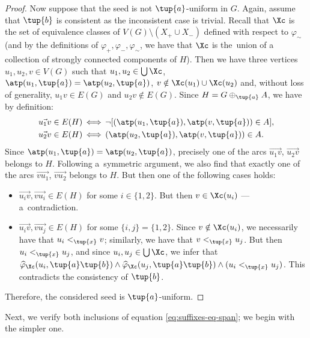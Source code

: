 \begin{proof}
    Now suppose that the seed is not $\tup{a}$-uniform in $G$.
    Again, assume that $\tup{b}$ is consistent as the inconsistent case is trivial.
    Recall that $\Xc$ is the set of equivalence classes of $V(G) \setminus (X_+ \cup X_-)$ defined with respect to $\varphi_\sim$ (and by the definitions of $\varphi_+, \varphi_-, \varphi_\sim$, we have that $\Xc$ is the~union of a collection of strongly connected components of $H$).
    Then we have three vertices $u_1, u_2, v \in V(G)$ such that $u_1, u_2 \in \bigcup \Xc$, $\atp(u_1, \tup{a}) = \atp(u_2, \tup{a})$, $v \notin \Xc(u_1) \cup \Xc(u_2)$ and, without loss of generality, $u_1v \in E(G)$ and $u_2v \notin E(G)$.
    Since $H = G \oplus_{\tup{a}} A$, we have by definition:
    \begin{align*}
        \vec{u_1v} \in E(H) \,&\Longleftrightarrow\, \neg [ (\atp(u_1, \tup{a}), \atp(v, \tup{a})) \in A ], \\
        \vec{u_2v} \in E(H) \,&\Longleftrightarrow\, (\atp(u_2, \tup{a}), \atp(v, \tup{a})) \in A.
    \end{align*}
    Since $\atp(u_1, \tup{a}) = \atp(u_2, \tup{a})$, precisely one of the arcs $\vec{u_1v}$, $\vec{u_2v}$ belongs to $H$.
    Following a~symmetric argument, we also find that exactly one of the arcs $\vec{vu_1}$, $\vec{vu_2}$ belongs to $H$.
    But then one of the following cases holds:
    \begin{itemize}[nosep]
        \item $\vec{u_iv}, \vec{vu_i} \in E(H)$ for some $i \in \{1,2\}$.
        But then $v \in \Xc(u_i)$ --- a~contradiction.
        \item $\vec{u_iv}, \vec{vu_j} \in E(H)$ for some $\{i, j\} = \{1, 2\}$.
        Since $v \notin \Xc(u_i)$, we necessarily have that $u_i <_{\tup{x}} v$; similarly, we have that $v <_{\tup{x}} u_j$.
        But then $u_i <_{\tup{x}} u_j$, and since $u_i, u_j \in \bigcup \Xc$, we infer that $\widehat{\varphi}_\Xc(u_i, \tup{a}\tup{b}) \wedge \widehat{\varphi}_\Xc(u_j, \tup{a}\tup{b}) \wedge (u_i <_{\tup{x}} u_j)$. This contradicts the consistency of $\tup{b}$.
    \end{itemize}
    Therefore, the considered seed is $\tup{a}$-uniform.
\end{proof}

Next, we verify both inclusions of equation \eqref{eq:suffixes-eq-span}; we begin with the simpler one.

